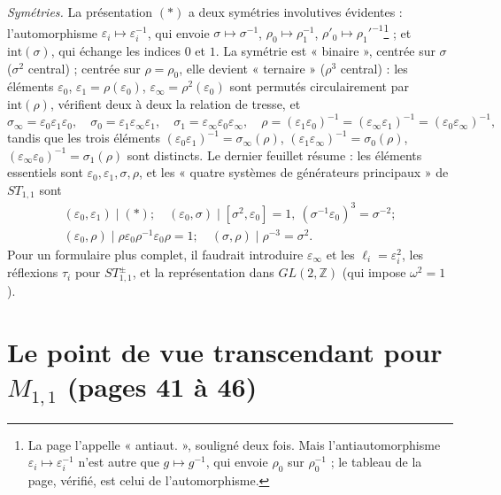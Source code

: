 \documentclass[11pt,a4paper]{article}
\begin{document}
\emph{Symétries.} La présentation $(*)$ a deux symétries involutives
évidentes : l'automorphisme $\varepsilon_i \mapsto \varepsilon_i^{-1}$, qui
envoie $\sigma \mapsto \sigma^{-1}$, $\rho_0 \mapsto \rho_1^{-1}$,
$\rho'_0 \mapsto \rho_1'^{-1}$\footnote{La page l'appelle « antiaut. », souligné
deux fois. Mais l'antiautomorphisme $\varepsilon_i \mapsto \varepsilon_i^{-1}$
n'est autre que $g \mapsto g^{-1}$, qui envoie $\rho_0$ sur $\rho_0^{-1}$ ; le
tableau de la page, vérifié, est celui de l'automorphisme.} ; et
$\mathrm{int}(\sigma)$, qui échange les indices $0$ et $1$. La symétrie est
« binaire », centrée sur $\sigma$ ($\sigma^2$ central) ; centrée sur
$\rho = \rho_0$, elle devient « ternaire » ($\rho^3$ central) : les éléments
$\varepsilon_0$, $\varepsilon_1 = \rho(\varepsilon_0)$,
$\varepsilon_\infty = \rho^2(\varepsilon_0)$ sont permutés circulairement par
$\mathrm{int}(\rho)$, vérifient deux à deux la relation de tresse, et
\[
\sigma_\infty = \varepsilon_0\varepsilon_1\varepsilon_0, \quad
\sigma_0 = \varepsilon_1\varepsilon_\infty\varepsilon_1, \quad
\sigma_1 = \varepsilon_\infty\varepsilon_0\varepsilon_\infty, \quad
\rho = (\varepsilon_1\varepsilon_0)^{-1} = (\varepsilon_\infty\varepsilon_1)^{-1} = (\varepsilon_0\varepsilon_\infty)^{-1},
\]
tandis que les trois éléments $(\varepsilon_0\varepsilon_1)^{-1} = \sigma_\infty(\rho)$,
$(\varepsilon_1\varepsilon_\infty)^{-1} = \sigma_0(\rho)$,
$(\varepsilon_\infty\varepsilon_0)^{-1} = \sigma_1(\rho)$ sont distincts. Le
dernier feuillet résume : les éléments essentiels sont
$\varepsilon_0, \varepsilon_1, \sigma, \rho$, et les « quatre systèmes de
générateurs principaux » de $ST_{1,1}$ sont
\[
\begin{gathered}
(\varepsilon_0, \varepsilon_1) \mid (*) ; \quad
(\varepsilon_0, \sigma) \mid [\sigma^2, \varepsilon_0] = 1,\ (\sigma^{-1}\varepsilon_0)^3 = \sigma^{-2} ; \\
(\varepsilon_0, \rho) \mid \rho\varepsilon_0\rho^{-1}\varepsilon_0\rho = 1 ; \quad
(\sigma, \rho) \mid \rho^{-3} = \sigma^2 .
\end{gathered}
\]
Pour un formulaire plus complet, il faudrait introduire
$\varepsilon_\infty$ et les $\ell_i = \varepsilon_i^2$, les réflexions $\tau_i$
pour $ST_{1,1}^{\pm}$, et la représentation dans $GL(2, \mathbb{Z})$ (qui
impose $\omega^2 = 1$).

\section*{Le point de vue transcendant pour $M_{1,1}$ (pages 41 à 46)}
\end{document}
